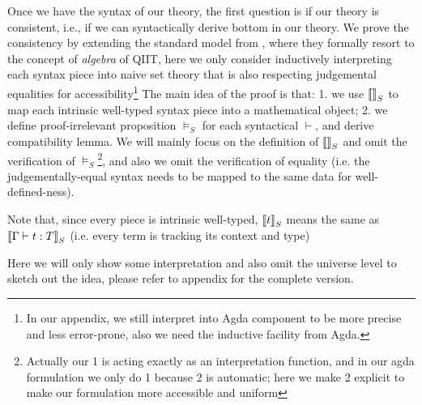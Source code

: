 Once we have the syntax of our theory, the first question is if our theory is consistent, i.e., if we can syntactically derive bottom in our theory. We prove the consistency by extending the standard model from \citep{kaposi2017type, kaposi2019gluing}, where they formally resort to the concept of \textit{algebra} of QIIT, here we only consider inductively interpreting each syntax piece into naive set theory that is also respecting judgemental equalities for accessibility\footnote{In our appendix, we still interpret into Agda component to be more precise and less error-prone, also we need the inductive facility from Agda.} The main idea of the proof is that: 1. we use ${{\llbracket {} \rrbracket}_S}$ to map each intrinsic well-typed syntax piece into a mathematical object; 2. we define proof-irrelevant proposition $\models_S$ for each syntactical $\vdash$, and derive compatibility lemma. We will mainly focus on the definition of ${{\llbracket {} \rrbracket}_S}$ and omit the verification of $\models_S$\footnote{Actually our 1 is acting exactly as an interpretation function, and in our agda formulation we only do 1 because 2 is automatic; here we make 2 explicit to make our formulation more accessible and uniform}, and also we omit the verification of equality (i.e. the judgementally-equal syntax needs to be mapped to the same data for well-defined-ness).

Note that, since every piece is intrinsic well-typed, ${{\llbracket {t} \rrbracket}_S}$ means the same as ${{\llbracket {{ {\Gamma} \vdash {t} : {T} }} \rrbracket}_S}$ (i.e. every term is tracking its context and type)

Here we will only show some interpretation and also omit the universe level to sketch out the idea, please refer to appendix for the complete version. 

\newcommand{\goodCtxS}[2]{{ {#1} \ \models_S }}
\newcommand{\goodTypeS}[3]{{ {#1} \models_S {#2} }}
\newcommand{\goodTermS}[3]{{ {#1} \models_S {#2} : {#3} }}
\newcommand{\goodSubS}[3]{{ {#1} \models_S {#2} : {#3} }}
\newcommand{\goodSigS}[3]{{ {#1} \models_S {#2} \ \  Sig^{#3} }}
\newcommand{\goodWSigS}[3]{{ {#1} \models_S {#2} \ \ WSig^{#3} }}
\newcommand{\goodSealS}[4]{{ {#1} \models_S {#2} : {#3} \  |\  {#4} }}
\newcommand{\goodInhS}[4]{{ {#1} \models_S {#2} : {#3} \twoheadrightarrow {#4}}}

